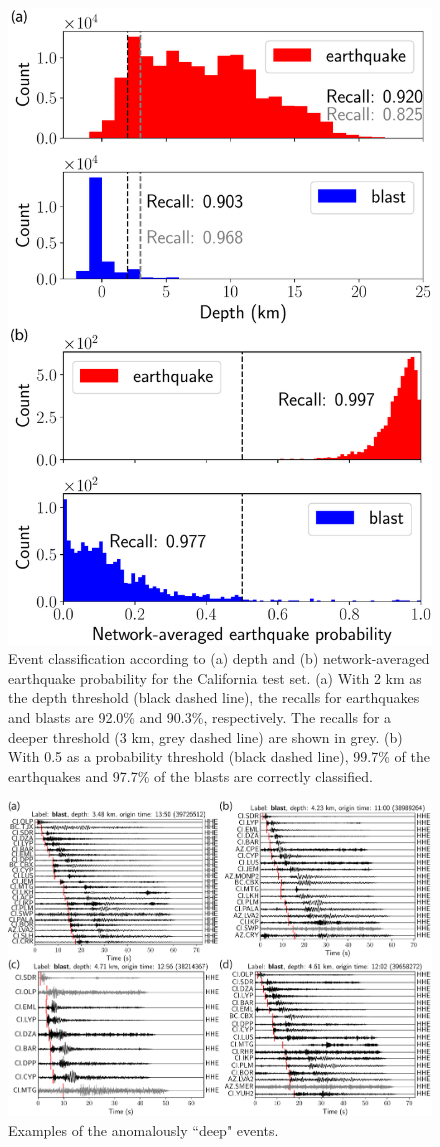 \documentclass[12pt]{article}
\begin{document}
\begin{figure}
        \centering
	\includegraphics[width=.5\textwidth]{depth_vs_networkaverage.pdf}
	\caption{Event classification according to (a) depth and (b) network-averaged earthquake probability for the California test set. (a) With 2 km as the depth threshold (black dashed line), the recalls for earthquakes and blasts are 92.0\% and 90.3\%, respectively. The recalls for a deeper threshold (3 km, grey dashed line) are shown in grey. (b) With 0.5 as a probability threshold (black dashed line), 99.7\% of the earthquakes and 97.7\% of the blasts are correctly classified.}
\end{figure}

\begin{figure}
	\centering
	\includegraphics[width=\columnwidth]{deep_blast.pdf}
	\caption{Examples of the anomalously ``deep" events.}
\end{figure}
\end{document}
